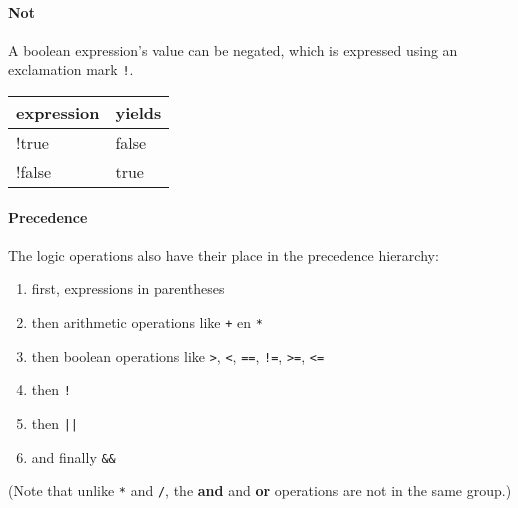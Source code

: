 \paragraph{Not}

A boolean expression's value can be negated, which is expressed using an exclamation mark \texttt{!}.

\begin{center}
  \ttfamily
  \begin{tabular}{l@{\qquad}l}
    {\normalfont expression} & {\normalfont yields} \\
    \midrule
    !true   & false \\
    !false  & true \\
    \midrule
  \end{tabular}
\end{center}


\paragraph{Precedence}

The logic operations also have their place in the precedence hierarchy:

\begin{enumerate}
  \item first, expressions in parentheses
  \item then arithmetic operations like \texttt{+} en \texttt{*}
  \item then boolean operations like \texttt{>}, \texttt{<}, \texttt{==}, \texttt{!=}, \texttt{>=}, \texttt{<=}
  \item then \texttt{!}
  \item then \texttt{||}
  \item and finally \texttt{\&\&}
\end{enumerate}

(Note that unlike \texttt{*} and \texttt{/}, the \textbf{and} and \textbf{or} operations are not in the same group.)
